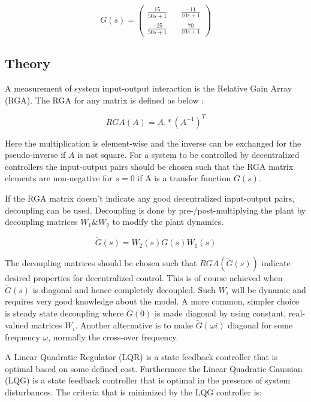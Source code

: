 \documentclass[a4paper, titlepage]{article}
\begin{document}
\begin{equation}
G(s) = 
\begin{pmatrix}
\frac{15}{50s + 1} && \frac{-11}{10s + 1} \\[6pt]
\frac{-25}{50s + 1} && \frac{70}{10s + 1}
\end{pmatrix}
\label{equ:origianlG}
\end{equation}

\subsection{Theory}

A measurement of system input-output interaction is the Relative Gain Array (RGA).
The RGA for any matrix is defined as below \citep[~p.219]{glad00}:

\begin{equation}
RGA(A) = A.*(A^{-1})^T
\label{equ:RGA}
\end{equation}

Here the multiplication is element-wise and the inverse can be exchanged for the pseudo-inverse if $A$ is not square.
For a system to be controlled by decentralized controllers the input-output pairs should be chosen such that the RGA matrix elements are non-negative for $s=0$ if A is a transfer function $G(s)$.

If the RGA matrix doesn't indicate any good decentralized input-output pairs, decoupling can be used.
Decoupling is done by pre-/post-multiplying the plant by decoupling matrices $W_1 \& W_2$ to modify the plant dynamics.

\begin{equation}
\tilde{G}(s) = W_2(s)G(s)W_1(s)
\end{equation}

The decoupling matrices should be chosen such that $RGA(\tilde{G}(s))$ indicate desired properties for decentralized control.
This is of course achieved when $\tilde{G}(s)$ is diagonal and hence completely decoupled.
Such $W_i$ will be dynamic and requires very good knowledge about the model.
A more common, simpler choice is steady state decoupling where $\tilde{G}(0)$ is made diagonal by using constant, real-valued matrices $W_i$.
Another alternative is to make $\tilde{G}(\omega i)$ diagonal for some frequency $\omega$, normally the cross-over frequency. \citep[~p.226]{glad00}








A Linear Quadratic Regulator (LQR) is a state feedback controller that is optimal based on some defined cost.
Furthermore the Linear Quadratic Gaussian (LQG) is a state feedback controller that is optimal in the presence of system disturbances.
The criteria that is minimized by the LQG controller is:
\end{document}
